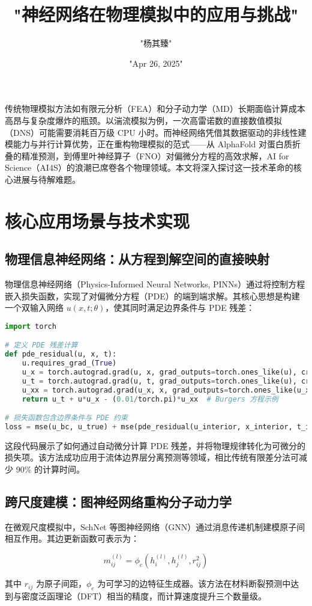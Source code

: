 \title{"神经网络在物理模拟中的应用与挑战"}
\author{"杨其臻"}
\date{"Apr 26, 2025"}
\maketitle
传统物理模拟方法如有限元分析（FEA）和分子动力学（MD）长期面临计算成本高昂与复杂度爆炸的瓶颈。以湍流模拟为例，一次高雷诺数的直接数值模拟（DNS）可能需要消耗百万级 CPU 小时。而神经网络凭借其数据驱动的非线性建模能力与并行计算优势，正在重构物理模拟的范式——从 AlphaFold 对蛋白质折叠的精准预测，到傅里叶神经算子（FNO）对偏微分方程的高效求解，AI for Science（AI4S）的浪潮已席卷各个物理领域。本文将深入探讨这一技术革命的核心进展与待解难题。\par
\chapter{核心应用场景与技术实现}
\section{物理信息神经网络：从方程到解空间的直接映射}
物理信息神经网络（Physics-Informed Neural Networks, PINNs）通过将控制方程嵌入损失函数，实现了对偏微分方程（PDE）的端到端求解。其核心思想是构建一个双输入网络 $u(x,t;\theta)$，使其同时满足边界条件与 PDE 残差：\par
\begin{lstlisting}[language=python]
import torch

# 定义 PDE 残差计算
def pde_residual(u, x, t):
    u.requires_grad_(True)
    u_x = torch.autograd.grad(u, x, grad_outputs=torch.ones_like(u), create_graph=True)[0]
    u_t = torch.autograd.grad(u, t, grad_outputs=torch.ones_like(u), create_graph=True)[0]
    u_xx = torch.autograd.grad(u_x, x, grad_outputs=torch.ones_like(u_x), create_graph=True)[0]
    return u_t + u*u_x - (0.01/torch.pi)*u_xx  # Burgers 方程示例

# 损失函数包含边界条件与 PDE 约束
loss = mse(u_bc, u_true) + mse(pde_residual(u_interior, x_interior, t_interior), 0)
\end{lstlisting}
这段代码展示了如何通过自动微分计算 PDE 残差，并将物理规律转化为可微分的损失项。该方法成功应用于流体边界层分离预测等领域，相比传统有限差分法可减少 90\%{} 的计算时间。\par
\section{跨尺度建模：图神经网络重构分子动力学}
在微观尺度模拟中，SchNet 等图神经网络（GNN）通过消息传递机制建模原子间相互作用。其边更新函数可表示为：\par
$$ m_{ij}^{(l)} = \phi_e(h_i^{(l)}, h_j^{(l)}, r_{ij}^2) $$\par
其中 $r_{ij}$ 为原子间距，$\phi_e$ 为可学习的边特征生成器。该方法在材料断裂预测中达到与密度泛函理论（DFT）相当的精度，而计算速度提升三个数量级。\par
